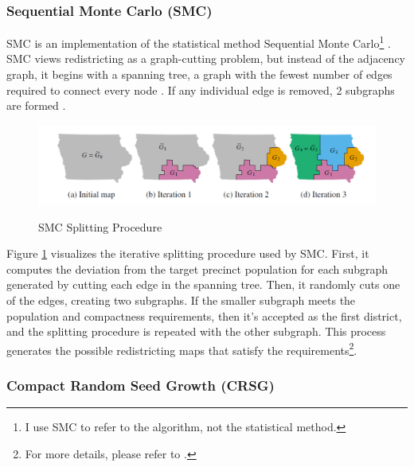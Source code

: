 \subsubsection{Sequential Monte Carlo (SMC)}
\label{sec:smc}

SMC is an implementation of the statistical method Sequential Monte Carlo\footnote{I use SMC to refer to the algorithm, not the statistical method.} \parencite{mccartan2020}. SMC views redistricting as a graph-cutting problem, but instead of the adjacency graph, it begins with a spanning tree, a graph with the fewest number of edges required to connect every node \parencite{hartsfield2003}. If any individual edge is removed, 2 subgraphs are formed \parencite{hartsfield2003}. 

\begin{figure}[hb]
    \caption{SMC Splitting Procedure}
    \includegraphics[width=\linewidth]{img/smc.PNG}
    \label{fig:smc}
    \raggedright
\end{figure}

Figure \ref{fig:smc} visualizes the iterative splitting procedure used by SMC. First, it computes the deviation from the target precinct population for each subgraph generated by cutting each edge in the spanning tree. Then, it randomly cuts one of the edges, creating two subgraphs. If the smaller subgraph meets the population and compactness requirements, then it's accepted as the first district, and the splitting procedure is repeated with the other subgraph. This process generates the possible redistricting maps that satisfy the requirements\footnote{For more details, please refer to \textcite{mccartan2020}.}. \parencite{mccartan2020}

\subsubsection{Compact Random Seed Growth (CRSG)}
\label{sec:crsg}

